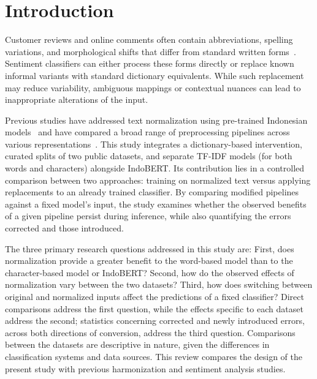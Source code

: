 \section{Introduction}
Customer reviews and online comments often contain abbreviations, spelling variations, and morphological shifts that differ from standard written forms~\cite{salsabila2018,wibowo2021}. Sentiment classifiers can either process these forms directly or replace known informal variants with standard dictionary equivalents. While such replacement may reduce variability, ambiguous mappings or contextual nuances can lead to inappropriate alterations of the input.

Previous studies have addressed text normalization using pre-trained Indonesian models~\cite{bustamin2025,budianoor2026} and have compared a broad range of preprocessing pipelines across various representations~\cite{prichanti2026}. This study integrates a dictionary-based intervention, curated splits of two public datasets, and separate TF-IDF models (for both words and characters) alongside IndoBERT. Its contribution lies in a controlled comparison between two approaches: training on normalized text versus applying replacements to an already trained classifier. By comparing modified pipelines against a fixed model's input, the study examines whether the observed benefits of a given pipeline persist during inference, while also quantifying the errors corrected and those introduced.

The three primary research questions addressed in this study are: First, does normalization provide a greater benefit to the word-based model than to the character-based model or IndoBERT? Second, how do the observed effects of normalization vary between the two datasets? Third, how does switching between original and normalized inputs affect the predictions of a fixed classifier? Direct comparisons address the first question, while the effects specific to each dataset address the second; statistics concerning corrected and newly introduced errors, across both directions of conversion, address the third question. Comparisons between the datasets are descriptive in nature, given the differences in classification systems and data sources. This review compares the design of the present study with previous harmonization and sentiment analysis studies.
